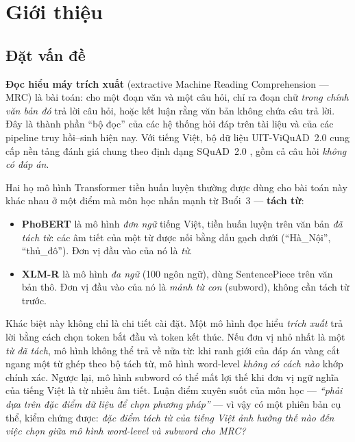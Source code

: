 \section{Giới thiệu}
\label{sec:intro}

\subsection{Đặt vấn đề}

\textbf{Đọc hiểu máy trích xuất} (extractive Machine Reading Comprehension --- MRC) là bài
toán: cho một đoạn văn và một câu hỏi, chỉ ra đoạn chữ \emph{trong chính văn bản đó} trả
lời câu hỏi, hoặc kết luận rằng văn bản không chứa câu trả lời. Đây là thành phần ``bộ
đọc'' của các hệ thống hỏi đáp trên tài liệu và của các pipeline truy hồi--sinh hiện nay.
Với tiếng Việt, bộ dữ liệu UIT-ViQuAD~2.0 \cite{nguyen2022vlsp} cung cấp nền tảng đánh giá
chung theo định dạng SQuAD~2.0 \cite{rajpurkar2018know}, gồm cả câu hỏi \emph{không có đáp án}.

Hai họ mô hình Transformer tiền huấn luyện thường được dùng cho bài toán này khác nhau ở
một điểm mà môn học nhấn mạnh từ Buổi~3 --- \textbf{tách từ}:

\begin{itemize}
  \item \textbf{PhoBERT} \cite{nguyen2020phobert} là mô hình \emph{đơn ngữ} tiếng Việt,
        tiền huấn luyện trên văn bản \emph{đã tách từ}: các âm tiết của một từ được nối
        bằng dấu gạch dưới (``Hà\_Nội'', ``thủ\_đô''). Đơn vị đầu vào của nó là \emph{từ}.
  \item \textbf{XLM-R} \cite{conneau2020xlmr} là mô hình \emph{đa ngữ} (100 ngôn ngữ), dùng
        SentencePiece \cite{kudo2018sentencepiece} trên văn bản thô. Đơn vị đầu vào của nó
        là \emph{mảnh từ con} (subword), không cần tách từ trước.
\end{itemize}

Khác biệt này không chỉ là chi tiết cài đặt. Một mô hình đọc hiểu \emph{trích xuất} trả
lời bằng cách chọn token bắt đầu và token kết thúc. Nếu đơn vị nhỏ nhất là một \emph{từ đã
tách}, mô hình không thể trả về nửa từ: khi ranh giới của đáp án vàng cắt ngang một từ ghép
theo bộ tách từ, mô hình word-level \emph{không có cách nào} khớp chính xác. Ngược lại, mô
hình subword có thể mất lợi thế khi đơn vị ngữ nghĩa của tiếng Việt là từ nhiều âm tiết.
Luận điểm xuyên suốt của môn học --- \emph{``phải dựa trên đặc điểm dữ liệu để chọn phương
pháp''} --- vì vậy có một phiên bản cụ thể, kiểm chứng được: \emph{đặc điểm tách từ của
tiếng Việt ảnh hưởng thế nào đến việc chọn giữa mô hình word-level và subword cho MRC?}

